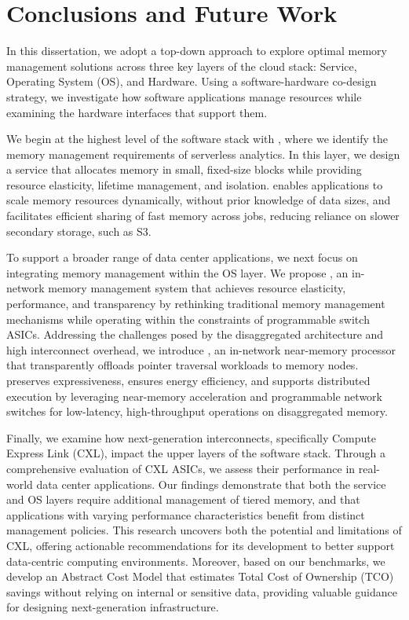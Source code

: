\chapter{Conclusions and Future Work}
\label{chap:future}

In this dissertation, we adopt a top-down approach to explore optimal memory management solutions across three key layers of the cloud stack: Service, Operating System (OS), and Hardware. Using a software-hardware co-design strategy, we investigate how software applications manage resources while examining the hardware interfaces that support them.

We begin at the highest level of the software stack with \jiffy, where we identify the memory management requirements of serverless analytics. In this layer, we design a service that allocates memory in small, fixed-size blocks while providing resource elasticity, lifetime management, and isolation. \jiffy enables applications to scale memory resources dynamically, without prior knowledge of data sizes, and facilitates efficient sharing of fast memory across jobs, reducing reliance on slower secondary storage, such as S3.

To support a broader range of data center applications, we next focus on integrating memory management within the OS layer. We propose \mind, an in-network memory management system that achieves resource elasticity, performance, and transparency by rethinking traditional memory management mechanisms while operating within the constraints of programmable switch ASICs. Addressing the challenges posed by the disaggregated architecture and high interconnect overhead, we introduce \pulse, an in-network near-memory processor that transparently offloads pointer traversal workloads to memory nodes. \pulse preserves expressiveness, ensures energy efficiency, and supports distributed execution by leveraging near-memory acceleration and programmable network switches for low-latency, high-throughput operations on disaggregated memory.

Finally, we examine how next-generation interconnects, specifically Compute Express Link (CXL), impact the upper layers of the software stack. Through a comprehensive evaluation of CXL ASICs, we assess their performance in real-world data center applications. Our findings demonstrate that both the service and OS layers require additional management of tiered memory, and that applications with varying performance characteristics benefit from distinct management policies. This research uncovers both the potential and limitations of CXL, offering actionable recommendations for its development to better support data-centric computing environments. Moreover, based on our benchmarks, we develop an Abstract Cost Model that estimates Total Cost of Ownership (TCO) savings without relying on internal or sensitive data, providing valuable guidance for designing next-generation infrastructure.




